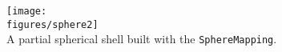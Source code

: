 \noindent
\begin{minipage}{.4\linewidth}
{\footnotesize
{}
}
\end{minipage}\hfill
\begin{minipage}{.6\linewidth}
  \begin{center}
   \texttt{[image: \\figures/sphere2]} \\
  {A partial spherical shell built with the {\tt SphereMapping}.}
  \end{center}
\end{minipage}




